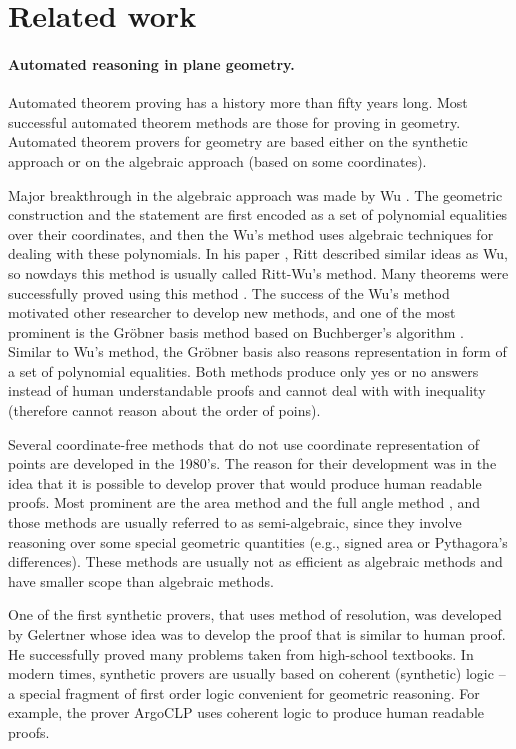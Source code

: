 \documentclass{aicom2e}
\begin{document}

\section{Related work}
\paragraph{Automated reasoning in plane geometry.}
Automated theorem proving has a history more than fifty years
long. Most successful automated theorem methods are those for proving
in geometry. Automated theorem provers for geometry are based either
on the synthetic approach or on the algebraic approach (based on some
coordinates).

Major breakthrough in the algebraic approach was made by Wu
\cite{wu}. The geometric construction and the statement are first
encoded as a set of polynomial equalities over their coordinates, and
then the Wu's method uses algebraic techniques for dealing with these
polynomials. In his paper \cite{ritt}, Ritt described similar ideas as
Wu, so nowdays this method is usually called Ritt-Wu's method. Many
theorems were successfully proved using this method \cite{}. The
success of the Wu's method motivated other researcher to develop new
methods, and one of the most prominent is the Gr\"obner basis method
based on Buchberger's algorithm \cite{}. Similar to Wu's method, the
Gr\"obner basis also reasons representation in form of a set of
polynomial equalities. Both methods produce only yes or no answers
instead of human understandable proofs and cannot deal with with
inequality (therefore cannot reason about the order of poins).

Several coordinate-free methods that do not use coordinate
representation of points are developed in the 1980's. The reason for
their development was in the idea that it is possible to develop
prover that would produce human readable proofs. Most prominent are
the area method \cite{area} and the full angle method
\cite{fullangle}, and those methods are usually referred to as
semi-algebraic, since they involve reasoning over some special
geometric quantities (e.g., signed area or Pythagora's
differences). These methods are usually not as efficient as algebraic
methods and have smaller scope than algebraic methods.

One of the first synthetic provers, that uses method of resolution,
was developed by Gelertner \cite{gelertner} whose idea was to develop
the proof that is similar to human proof. He successfully proved many
problems taken from high-school textbooks. In modern times, synthetic
provers are usually based on coherent (synthetic) logic -- a special
fragment of first order logic convenient for geometric reasoning. For
example, the prover ArgoCLP \cite{sana} uses coherent logic to produce
human readable proofs.
\end{document}

